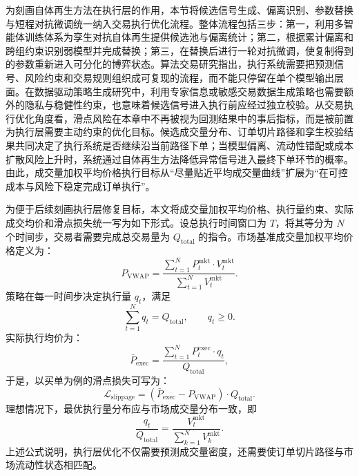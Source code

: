 为刻画自体再生方法在执行层的作用，本节将候选信号生成、偏离识别、参数替换与短程对抗微调统一纳入交易执行优化流程。整体流程包括三步：第一，利用多智能体训练体系为孪生对抗自体再生提供候选池与偏离统计；第二，根据累计偏离和跨组约束识别弱模型并完成替换；第三，在替换后进行一轮对抗微调，使复制得到的参数重新进入可分化的博弈状态。算法交易研究指出，执行系统需要把预测信号、风险约束和交易规则组织成可复现的流程，而不能只停留在单个模型输出层面\cite{kearns2007algorithmic}。在数据驱动策略生成研究中，利用专家信息或敏感交易数据生成策略也需要额外的隐私与稳健性约束，也意味着候选信号进入执行前应经过独立校验\cite{chen2022generating}。从交易执行优化角度看，滑点风险在本章中不再被视为回测结果中的事后指标，而是被前置为执行层需要主动约束的优化目标。候选成交量分布、订单切片路径和孪生校验结果共同决定了执行系统是否继续沿当前路径下单；当模型偏离、流动性错配或成本扩散风险上升时，系统通过自体再生方法降低异常信号进入最终下单环节的概率。由此，成交量加权平均价格执行目标从“尽量贴近平均成交量曲线”扩展为“在可控成本与风险下稳定完成订单执行”。

为便于后续刻画执行层修复目标，本文将成交量加权平均价格、执行量约束、实际成交均价和滑点损失统一写为如下形式。设总执行时间窗口为 $T$，将其等分为 $N$ 个时间步，交易者需要完成总交易量为 $Q_{\mathrm{total}}$ 的指令。市场基准成交量加权平均价格定义为：
\begin{equation}
P_{\mathrm{VWAP}}=
\frac{\sum_{t=1}^{N} P_t^{\mathrm{mkt}} \cdot V_t^{\mathrm{mkt}}}{\sum_{t=1}^{N} V_t^{\mathrm{mkt}}}.
\label{eq:VWAP_definition_new}
\end{equation}
策略在每一时间步决定执行量 $q_t$，满足
\begin{equation}
\sum_{t=1}^{N} q_t = Q_{\mathrm{total}}, \qquad q_t \ge 0.
\label{eq:inventory_constraint_new}
\end{equation}
实际执行均价为：
\begin{equation}
\bar{P}_{\mathrm{exec}}=
\frac{\sum_{t=1}^{N} P_t^{\mathrm{exec}} \cdot q_t}{Q_{\mathrm{total}}},
\label{eq:exec_price_new}
\end{equation}
于是，以买单为例的滑点损失可写为：
\begin{equation}
\mathcal{L}_{\mathrm{slippage}}=
\left(\bar{P}_{\mathrm{exec}}-P_{\mathrm{VWAP}}\right)\cdot Q_{\mathrm{total}}.
\label{eq:slippage_loss_new}
\end{equation}
理想情况下，最优执行量分布应与市场成交量分布一致，即
\begin{equation}
\frac{q_t}{Q_{\mathrm{total}}}=
\frac{V_t^{\mathrm{mkt}}}{\sum_{k=1}^{N} V_k^{\mathrm{mkt}}}.
\label{eq:oracle_policy_new}
\end{equation}
上述公式说明，执行层优化不仅需要预测成交量密度，还需要使订单切片路径与市场流动性状态相匹配。

